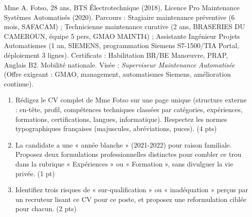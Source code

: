 \documentclass[11pt]{article}
\begin{document}
\begin{exercice}
Mme A. Fotso, 28 ans, BTS Électrotechnique (2018), Licence Pro Maintenance Systèmes Automatisés (2020). Parcours : Stagiaire maintenance préventive (6 mois, SAFACAM) ; Technicienne maintenance curative (2 ans, BRASERIES DU CAMEROUN, équipe 5 pers, GMAO MAINTI4) ; Assistante Ingénieur Projets Automatismes (1 an, SIEMENS, programmation Siemens S7-1500/TIA Portal, déploiement 3 lignes). Certificats : Habilitation BR/BE Manœuvre, PRAP, Anglais B2. Mobilité nationale. Visée : \textit{Superviseur Maintenance Automatisée} (Offre exigeant : GMAO, management, automatismes Siemens, amélioration continue).
\begin{enumerate}
    \item Rédigez le CV complet de Mme Fotso sur une page unique (structure externe : en-tête, profil, compétences techniques classées par catégories, expériences, formations, certifications, langues, informatique). Respectez les normes typographiques françaises (majuscules, abréviations, puces). (4 pts)
    \item La candidate a une « année blanche » (2021-2022) pour raison familiale. Proposez deux formulations professionnelles distinctes pour combler ce trou dans la rubrique « Expériences » ou « Formation », sans divulguer la vie privée. (1 pt)
    \item Identifiez trois risques de « sur-qualification » ou « inadéquation » perçus par un recruteur lisant ce CV pour ce poste, et proposez une reformulation ciblée pour chacun. (2 pts)
\end{enumerate}
\end{exercice}
\end{document}
